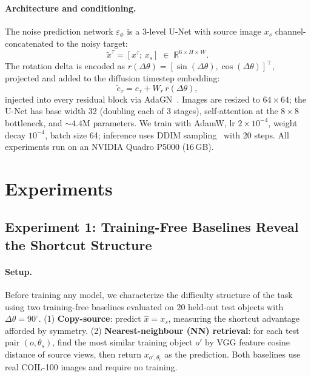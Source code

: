 \documentclass[11pt]{article}
\newcommand{\R}{\mathbb{R}}
\newcommand{\Dtheta}{\Delta\theta}
\newcommand{\eps}{\varepsilon}
\begin{document}
\paragraph{Architecture and conditioning.}
The noise prediction network $\eps_\phi$ is a 3-level U-Net with source image
$x_s$ channel-concatenated to the noisy target:
\begin{equation}
  \tilde{x}^\tau = [x^\tau;\, x_s] \;\in\; \R^{6\times H\times W}.
  \label{eq:channel_concat}
\end{equation}
The rotation delta is encoded as $r(\Dtheta) = [\sin(\Dtheta),\cos(\Dtheta)]^\top$,
projected and added to the diffusion timestep embedding:
\begin{equation}
  \tilde{e}_\tau = e_\tau + W_r\, r(\Dtheta),
  \label{eq:emb_injection}
\end{equation}
injected into every residual block via AdaGN~\cite{dhariwal2021beats}.
Images are resized to $64\times64$; the U-Net has base width 32 (doubling each
of 3 stages), self-attention at the $8\times8$ bottleneck, and ${\sim}4.4$M
parameters. We train with AdamW, lr $2\times10^{-4}$, weight decay $10^{-4}$,
batch size 64; inference uses DDIM sampling~\cite{song2021ddim} with 20 steps.
All experiments run on an NVIDIA Quadro P5000 (16\,GB).

\section{Experiments}
\label{sec:experiments}

\subsection{Experiment 1: Training-Free Baselines Reveal the Shortcut Structure}
\label{ssec:exp1}

\paragraph{Setup.}
Before training any model, we characterize the difficulty structure of the task
using two training-free baselines evaluated on 20 held-out test objects with
$\Dtheta = 90^{\circ}$. (1) \textbf{Copy-source}: predict $\hat{x} = x_s$,
measuring the shortcut advantage afforded by symmetry. (2)
\textbf{Nearest-neighbour (NN) retrieval}: for each test pair $(o, \theta_s)$,
find the most similar training object $o'$ by VGG feature cosine distance of
source views, then return $x_{o', \theta_t}$ as the prediction. Both baselines
use real COIL-100 images and require no training.
\end{document}
